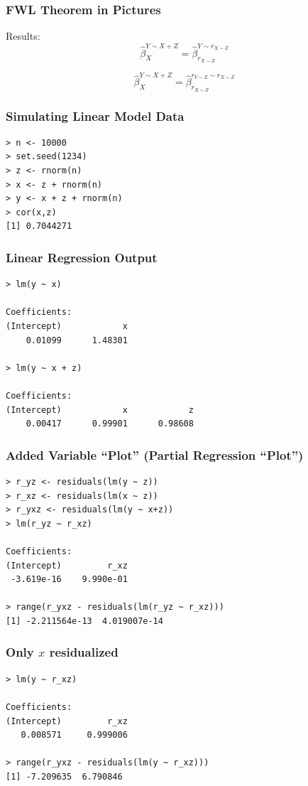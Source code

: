 \documentclass{beamer}
\begin{document}
\begin{frame}
\frametitle{FWL Theorem in Pictures}

Results: $$\hat{\beta}_{X}^{Y \sim X+Z} = \hat{\beta}_{r_{X\sim Z}}^{Y \sim r_{X\sim Z}}$$

$$\hat{\beta}_{X}^{Y \sim X+Z} = \hat{\beta}_{r_{X \sim Z}}^{r_{Y\sim Z} \sim r_{X\sim Z}}$$




\end{frame}


\begin{frame}[fragile]
\frametitle{Simulating Linear Model Data}

\begin{verbatim}
> n <- 10000
> set.seed(1234)
> z <- rnorm(n)
> x <- z + rnorm(n)
> y <- x + z + rnorm(n)
> cor(x,z)
[1] 0.7044271
\end{verbatim}

\end{frame}

\begin{frame}[fragile]
\frametitle{Linear Regression Output}

\begin{verbatim}
> lm(y ~ x)

Coefficients:
(Intercept)            x  
    0.01099      1.48301  

> lm(y ~ x + z)

Coefficients:
(Intercept)            x            z  
    0.00417      0.99901      0.98608 
\end{verbatim}

\end{frame}

\begin{frame}[fragile]
\frametitle{Added Variable ``Plot'' (Partial Regression ``Plot'')}

\begin{verbatim}
> r_yz <- residuals(lm(y ~ z))
> r_xz <- residuals(lm(x ~ z))
> r_yxz <- residuals(lm(y ~ x+z))
> lm(r_yz ~ r_xz)

Coefficients:
(Intercept)         r_xz  
 -3.619e-16    9.990e-01  

> range(r_yxz - residuals(lm(r_yz ~ r_xz)))
[1] -2.211564e-13  4.019007e-14
\end{verbatim}

\end{frame}


\begin{frame}[fragile]
\frametitle{Only $x$ residualized}

\begin{verbatim}
> lm(y ~ r_xz)

Coefficients:
(Intercept)         r_xz  
   0.008571     0.999006  

> range(r_yxz - residuals(lm(y ~ r_xz)))
[1] -7.209635  6.790846
\end{verbatim}

\end{frame}
\end{document}

